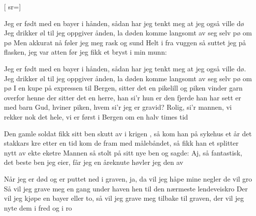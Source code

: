 
[
	sr={}]
  
\beginverse*
Jeg er født med en bayer i hånden,
sådan har jeg tenkt meg
at jeg også ville dø
Jeg drikker øl til jeg oppgiver ånden,
la døden komme langsomt
av seg selv pø om pø
Men akkurat nå føler jeg meg rask og sund
Helt i fra vuggen så suttet jeg på flasken,
jeg var atten før jeg fikk et bryst i min munn:
\endverse

\beginverse*
Jeg er født med en bayer i hånden,
sådan har jeg tenkt meg
at jeg også ville dø.
Jeg drikker øl til jeg oppgiver ånden,
la døden komme langsomt av seg selv pø om pø
I en kupe på expressen til Bergen,
sitter det en pikelill og piken vinder garn
overfor henne der sitter det en herre,
han si'r hun er den fjerde
han har sett er med barn
Gud, hviner piken, hvem si'r jeg er gravid?
Rolig, si'r mannen, vi rekker nok det hele,
vi er først i Bergen om en halv times tid
\endverse

\beginverse*
Den gamle soldat fikk
sitt ben skutt av i krigen , så kom han på sykehus
et år det stakkars kre
etter en tid kom de fram med målebåndet,
så fikk han et splitter nytt av ekte eketre
Mannen så stolt på sitt nye ben og sagde:
Aj, så fantastisk, det beste ben jeg eier,
får jeg en åreknute høvler jeg den av
\endverse

\beginverse*
Når jeg er død og er puttet ned i graven,
ja, da vil jeg håpe mine negler de vil gro
Så vil jeg grave meg en gang under haven
hen til den nærmeste lendeveiskro
Der vil jeg kjøpe en bayer eller to,
så vil jeg grave meg tilbake til graven,
der vil jeg nyte dem i fred og i ro
\endverse

\endsong
